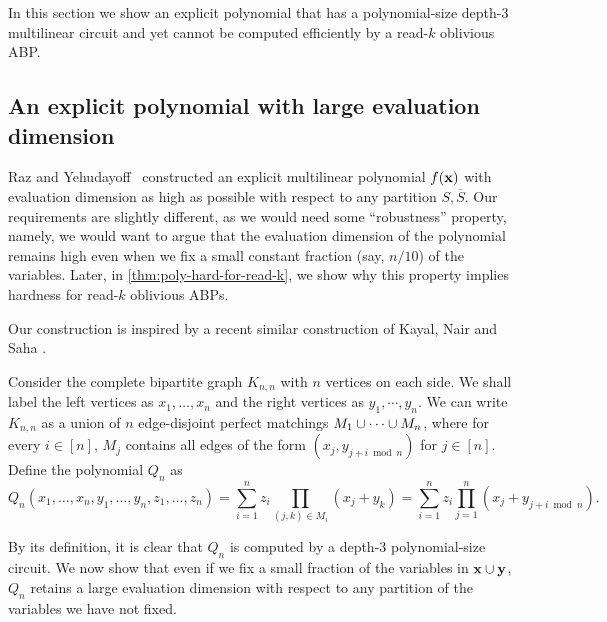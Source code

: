 \documentclass[11pt]{article}
\begin{document}
In this section we show an explicit polynomial that has a polynomial-size depth-$3$ multilinear circuit and yet cannot be computed efficiently by a read-$k$ oblivious ABP.

\subsection{An explicit polynomial with large evaluation dimension}

Raz and Yehudayoff~\cite{raz-yehudayoff} constructed an explicit multilinear polynomial $f(\mathbf{x})$ with evaluation dimension as high as possible with respect to any partition $S, \overline{S}$.
Our requirements are slightly different, as we would need some ``robustness'' property, namely, we would want to argue that the evaluation dimension of the polynomial remains high even when we fix a small constant fraction (say, $n/10$) of the variables. Later, in \autoref{thm:poly-hard-for-read-k}, we show why this property implies hardness for read-$k$ oblivious ABPs.

Our construction is inspired by a recent similar construction of Kayal, Nair and Saha \cite{KNS15}.

Consider the complete bipartite graph $K_{n,n}$ with $n$ vertices on each side.
We shall label the left vertices as $x_1,\ldots, x_n$ and the right vertices as $y_1,\cdots, y_n$.
We can write $K_{n,n}$ as a union of $n$ edge-disjoint perfect matchings $M_1 \cup \cdots \cup M_n$, where for every $i \in [n]$, $M_j$ contains all edges of the form $(x_j, y_{j+i \bmod n})$ for $j \in [n]$.
Define the polynomial $Q_{n}$ as
\begin{equation}\label{eqn:Qn-defn}
Q_{n}(x_1,\ldots, x_n, y_1,\ldots, y_n,z_1,\ldots, z_n) = \sum_{i=1}^n z_i \prod_{(j,k) \in M_i} (x_j + y_k)
= \sum_{i=1}^n z_i \prod_{j=1}^n (x_j + y_{j + i \bmod n}).
\end{equation}

By its definition, it is clear that $Q_n$ is computed by a depth-$3$ polynomial-size circuit. We now show that even if we fix a small fraction of the variables in $\mathbf{x} \cup \mathbf{y}$, $Q_n$ retains a large evaluation dimension with respect to any partition of the variables we have not fixed.
\end{document}
